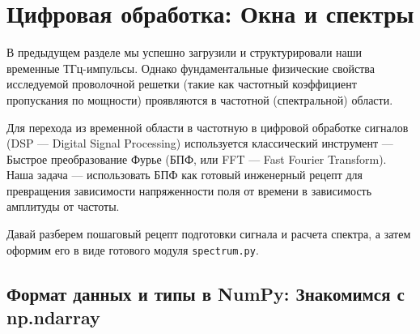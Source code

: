 
\section{Цифровая обработка: Окна и спектры}

В предыдущем разделе мы успешно загрузили и структурировали наши временные ТГц-импульсы. Однако фундаментальные физические свойства исследуемой проволочной решетки (такие как частотный коэффициент пропускания по мощности) проявляются в частотной (спектральной) области. 

Для перехода из временной области в частотную в цифровой обработке сигналов (DSP — Digital Signal Processing) используется классический инструмент — Быстрое преобразование Фурье (БПФ, или FFT — Fast Fourier Transform). Наша задача — использовать БПФ как готовый инженерный рецепт для превращения зависимости напряженности поля от времени в зависимость амплитуды от частоты.


Давай разберем пошаговый рецепт подготовки сигнала и расчета спектра, а затем оформим его в виде готового модуля \texttt{spectrum.py}.

\subsection{Формат данных и типы в NumPy: Знакомимся с np.ndarray}

